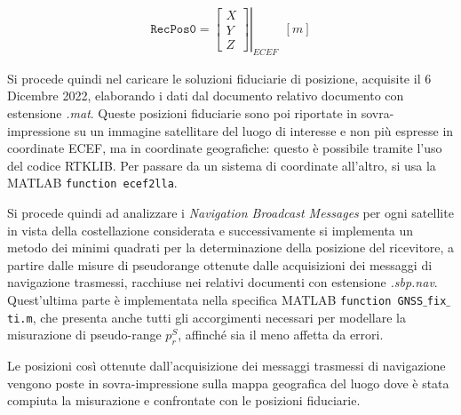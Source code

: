 \documentclass[a4paper,11pt,twoside]{book}
\begin{document}
	\begin{equation}
		\begin{aligned}
			\texttt{RecPos0} = \left.  \begin{bmatrix}
				X \\
				Y \\
				Z
			\end{bmatrix} \right|_{ECEF} \ \ [m]
		\end{aligned}
	\end{equation}

	Si procede quindi nel caricare le soluzioni fiduciarie di posizione, acquisite il 6 Dicembre 2022, elaborando i dati dal documento relativo documento con estensione \textsl{.mat}. Queste posizioni fiduciarie sono poi riportate in sovra-impressione su un immagine satellitare del luogo di interesse e non più espresse in coordinate ECEF, ma in coordinate geografiche: questo è possibile tramite l'uso del codice RTKLIB. Per passare da un sistema di coordinate all'altro, si usa la MATLAB \texttt{function ecef2lla}. %
	

	Si procede quindi ad analizzare i \textit{Navigation Broadcast Messages} per ogni satellite in vista della costellazione considerata e successivamente si implementa un metodo dei minimi quadrati per la determinazione della posizione del ricevitore, a partire dalle misure di pseudorange ottenute dalle acquisizioni dei messaggi di navigazione trasmessi, racchiuse nei relativi documenti con estensione \textsl{.sbp.nav}. Quest'ultima parte è implementata nella specifica MATLAB \texttt{function GNSS$\_$fix$\_$ti.m}, che presenta anche tutti gli accorgimenti necessari per modellare la misurazione di pseudo-range $p^S_r$, affinché sia il meno affetta da errori.
	
	Le posizioni così ottenute dall'acquisizione dei messaggi trasmessi di navigazione vengono poste in sovra-impressione sulla mappa geografica del luogo dove è stata compiuta la misurazione e confrontate con le posizioni fiduciarie.
	
\end{document}
